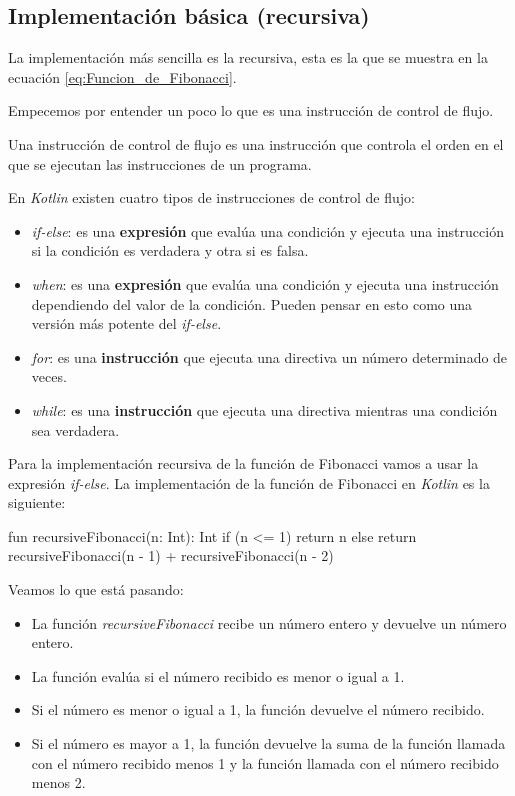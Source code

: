 
\subsection{Implementación básica (recursiva)}
  La implementación más sencilla es la recursiva, esta es la que se muestra en la ecuación
  \ref{eq:Funcion_de_Fibonacci}.

  Empecemos por entender un poco lo que es una instrucción de control de flujo.

  \begin{defaultbox}
    Una instrucción de control de flujo es una instrucción que controla el 
    orden en el que se ejecutan las instrucciones de un programa.
  \end{defaultbox}

  En \textit{Kotlin} existen cuatro tipos de instrucciones de control de flujo:

  \begin{itemize}
    \item \textit{if-else}: es una \textbf{expresión} que evalúa una condición y ejecuta una 
      instrucción si la condición es verdadera y otra si es falsa.
    \item \textit{when}: es una \textbf{expresión} que evalúa una condición y ejecuta una 
      instrucción dependiendo del valor de la condición.
      Pueden pensar en esto como una versión más potente del \textit{if-else}.
    \item \textit{for}: es una \textbf{instrucción} que ejecuta una directiva un número determinado 
      de veces.
    \item \textit{while}: es una \textbf{instrucción} que ejecuta una directiva mientras una 
      condición sea verdadera.
  \end{itemize}

  Para la implementación recursiva de la función de Fibonacci vamos a usar la expresión 
  \textit{if-else}.
  La implementación de la función de Fibonacci en \textit{Kotlin} es la siguiente:

  \begin{kotlin}
    fun recursiveFibonacci(n: Int): Int {
      if (n <= 1) {
        return n
      } else {
        return recursiveFibonacci(n - 1) + recursiveFibonacci(n - 2)
      }
    }
  \end{kotlin}

  Veamos lo que está pasando:

  \begin{itemize}
    \item La función \textit{recursiveFibonacci} recibe un número entero y devuelve un
      número entero.
    \item La función evalúa si el número recibido es menor o igual a 1.
    \item Si el número es menor o igual a 1, la función devuelve el número recibido.
    \item Si el número es mayor a 1, la función devuelve la suma de la función llamada con el
      número recibido menos 1 y la función llamada con el número recibido menos 2.
  \end{itemize}

